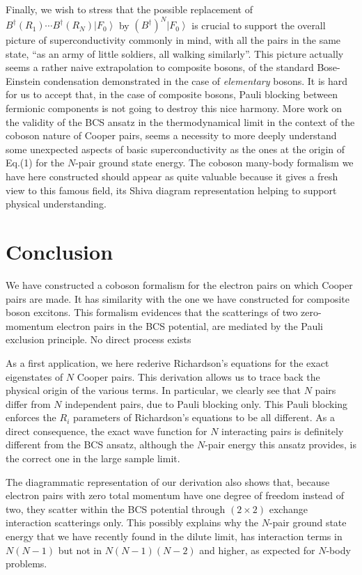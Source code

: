 \documentclass[aps,prb,superscriptaddress,showpacs,reprint,lengthcheck]{revtex4}
\begin{document}
Finally, we wish to stress that the possible replacement of $B^{\dagger}(R_1)\cdots{}B^{\dagger}(R_N)%
\left|F_0\right>  $ by $\left(B^{\dagger}\right) ^N\left|F_0\right>  $ is
crucial to support the overall picture of
superconductivity commonly in mind, with all the pairs in the same state, ``as an army of
little soldiers, all walking similarly''.  This picture actually seems a rather naive extrapolation to composite bosons, of the standard Bose-Einstein condensation demonstrated in the case of  \emph{elementary} bosons. It is hard for us to accept that, in the case of composite bosons, Pauli blocking between fermionic components is not going to destroy this nice harmony.
More work on the validity of the BCS 
ansatz in the thermodynamical limit in the context of the coboson nature of Cooper pairs, seems a necessity to more deeply understand some unexpected aspects of basic superconductivity as the ones at the origin of Eq.(1) for the $N$-pair ground state energy. The coboson many-body formalism we have here constructed should appear as quite valuable because it gives a fresh view to this famous field, its Shiva diagram representation helping to support physical understanding.
 

\section{Conclusion}

We have constructed a coboson formalism for the electron pairs on which Cooper pairs are made. It has similarity with the one we have constructed for composite boson excitons. This formalism evidences that the scatterings of two zero-momentum electron pairs in the BCS potential, are mediated by the Pauli exclusion principle. No direct process exists


As a first application, we here rederive Richardson's equations for the exact eigenstates of $N$ Cooper pairs. This 
  derivation allows us to trace back
the physical origin of the various terms. In
particular, we clearly see that $N$ pairs differ from $N$ independent
pairs, due to Pauli blocking only. This Pauli blocking
enforces the $R_i$ parameters of Richardson's equations to be all different. 
As a direct consequence, the exact wave function for $N$ interacting pairs is 
definitely different from the BCS ansatz, although the $N$-pair energy this ansatz provides, is the correct one in the large sample limit. 

The diagrammatic
representation of our derivation also shows that, because electron pairs
with zero total momentum have one degree of freedom instead of two, they scatter within the BCS potential through 
$(2\times2)$ exchange interaction scatterings only. This possibly explains
why the $N$-pair ground state energy that we have recently found in the dilute limit, has interaction terms in $N(N-1)$ but not in $N(N-1)(N-2)
$ and higher, as expected for $N$-body problems.
\end{document}
